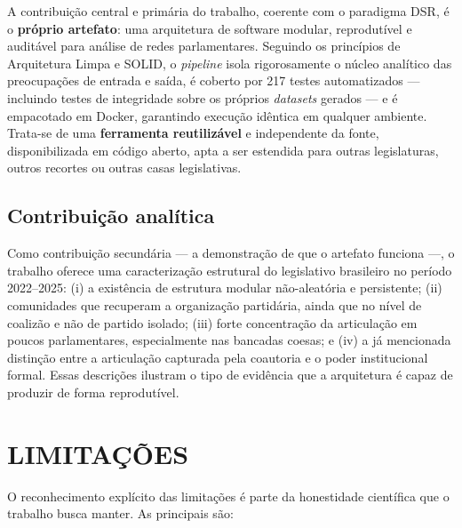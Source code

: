 \documentclass[
      12pt,
      a4paper,
      openright,
      oneside,
      chapter=TITLE,
      section=TITLE,
      english,
      french,
      spanish,
      brazilian
    ]{abntex2}
\begin{document}
    A contribuição central e primária do trabalho, coerente com o paradigma DSR, é o \textbf{próprio artefato}: uma arquitetura de software modular, reprodutível e auditável para análise de redes parlamentares. Seguindo os princípios de Arquitetura Limpa e SOLID, o \textit{pipeline} isola rigorosamente o núcleo analítico das preocupações de entrada e saída, é coberto por 217 testes automatizados --- incluindo testes de integridade sobre os próprios \textit{datasets} gerados --- e é empacotado em Docker, garantindo execução idêntica em qualquer ambiente. Trata-se de uma \textbf{ferramenta reutilizável} e independente da fonte, disponibilizada em código aberto, apta a ser estendida para outras legislaturas, outros recortes ou outras casas legislativas.
    
    \subsection{Contribuição analítica}
    
    Como contribuição secundária --- a demonstração de que o artefato funciona ---, o trabalho oferece uma caracterização estrutural do legislativo brasileiro no período 2022--2025: (i) a existência de estrutura modular não-aleatória e persistente; (ii) comunidades que recuperam a organização partidária, ainda que no nível de coalizão e não de partido isolado; (iii) forte concentração da articulação em poucos parlamentares, especialmente nas bancadas coesas; e (iv) a já mencionada distinção entre a articulação capturada pela coautoria e o poder institucional formal. Essas descrições ilustram o tipo de evidência que a arquitetura é capaz de produzir de forma reprodutível.
    
    \section{LIMITAÇÕES}
    
    O reconhecimento explícito das limitações é parte da honestidade científica que o trabalho busca manter. As principais são:
    
\end{document}
